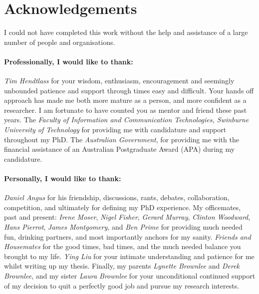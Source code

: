 
%
%


\chapter*{Acknowledgements}
\label{acknowledgements}
I could not have completed this work without the help and assistance of a large number of people and organisations.

%
%
\subsubsection*{Professionally, I would like to thank:} 
\emph{Tim Hendtlass} for your wisdom, enthusiasm, encouragement and seemingly unbounded patience and support through times easy and difficult. Your hands off approach has made me both more mature as a person, and more confident as a researcher. I am fortunate to have counted you as mentor and friend these past years.
The \emph{Faculty of Information and Communication Technologies, Swinburne University of Technology} for providing me with candidature and support throughout my PhD.
The \emph{Australian Government}, for providing me with the financial assistance of an Australian Postgraduate Award (APA) during my candidature.


%
%


%
%
\subsubsection*{Personally, I would like to thank:}
\emph{Daniel Angus} for his friendship, discussions, rants, debates, collaboration, competition, and ultimately for defining my PhD experience.
My officemates, past and present: \emph{Irene Moser}, \emph{Nigel Fisher}, \emph{Gerard Murray}, \emph{Clinton Woodward}, \emph{Hans Pierrot}, \emph{James Montgomery}, and \emph{Ben Prime} for providing much needed fun, drinking partners, and most importantly anchors for my sanity.
\emph{Friends and Housemates} for the good times, bad times, and the much needed balance you brought to my life.
\emph{Ying Liu} for your intimate understanding and patience for me whilst writing up my thesis.
Finally, my parents \emph{Lynette Brownlee} and \emph{Derek Brownlee}, and my sister \emph{Laura Brownlee} for your unconditional continued support of my decision to quit a perfectly good job and pursue my research interests.

